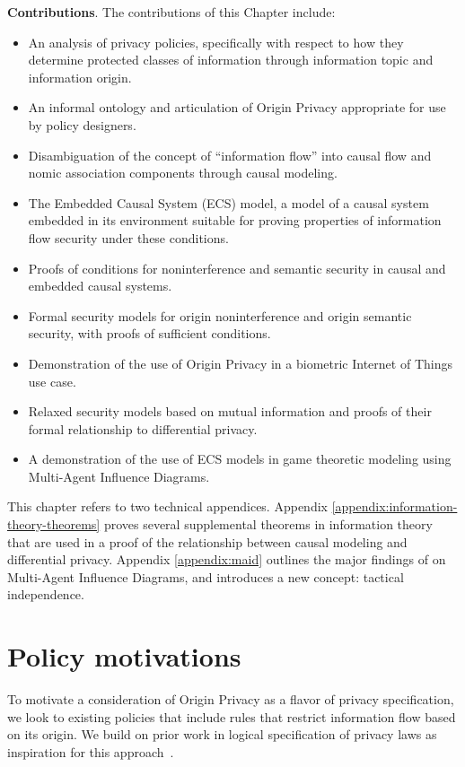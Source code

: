 \documentclass[../thesis.tex]{subfiles}
\begin{document}
\textbf{Contributions}. The contributions of this Chapter
include:
\begin{itemize}
\item An analysis of privacy policies, specifically with
  respect to how they determine protected classes of information
  through information topic and information origin.
\item An informal ontology and articulation of Origin Privacy
  appropriate for use by policy designers.
\item Disambiguation of the concept of ``information flow''
  into causal flow and nomic association components through
  causal modeling.
\item The Embedded Causal System (ECS) model, a model of a
  causal system embedded in its environment suitable for
  proving properties of information flow security under these
  conditions.
\item Proofs of conditions for noninterference and semantic security
  in causal and embedded causal systems.
\item Formal security models for origin noninterference and origin
  semantic security, with proofs of sufficient conditions.
\item Demonstration of the use of Origin Privacy in a
  biometric Internet of Things use case.
\item Relaxed security models based on mutual information and
  proofs of their formal relationship to differential privacy.
\item A demonstration of the use of ECS models in game theoretic
  modeling using Multi-Agent Influence Diagrams.
\end{itemize}

This chapter refers to two technical appendices.
Appendix \ref{appendix:information-theory-theorems}
proves several supplemental theorems in information theory
that are used in a proof of the relationship between
causal modeling and differential privacy.
Appendix \ref{appendix:maid} outlines the major
findings of \citet{koller2003multi} on Multi-Agent
Influence Diagrams, and introduces a new concept:
tactical independence.

\section{Policy motivations}
\label{sec:policy}

To motivate a consideration of Origin Privacy as a flavor
of privacy specification, we look to existing policies that
include rules that restrict information flow based on its origin.
We build on prior work in logical specification of privacy
laws as inspiration for this 
approach~\cite{barth06sp,DeYoungGJKD10}.
\end{document}
